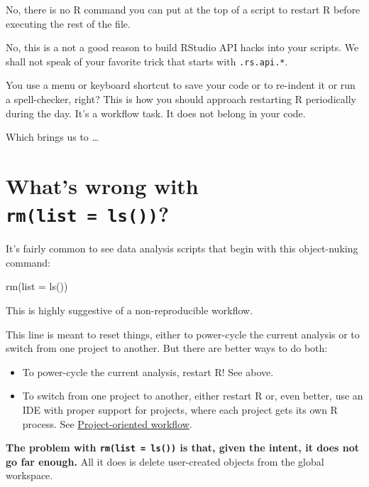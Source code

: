 \documentclass[
  letterpaper,
]{book}
\newenvironment{Shaded}{\begin{snugshade}}{\end{snugshade}}
\newcommand{\AttributeTok}[1]{\textcolor[rgb]{0.40,0.45,0.13}{#1}}
\newcommand{\FunctionTok}[1]{\textcolor[rgb]{0.28,0.35,0.67}{#1}}
\newcommand{\NormalTok}[1]{\textcolor[rgb]{0.00,0.23,0.31}{#1}}
\providecommand{\tightlist}{%
  \setlength{\itemsep}{0pt}\setlength{\parskip}{0pt}}\usepackage{longtable,booktabs,array}
\begin{document}
No, there is no R command you can put at the top of a script to restart
R before executing the rest of the file.

No, this is a not a good reason to build RStudio API hacks into your
scripts. We shall not speak of your favorite trick that starts with
\texttt{.rs.api.*}.

You use a menu or keyboard shortcut to save your code or to re-indent it
or run a spell-checker, right? This is how you should approach
restarting R periodically during the day. It's a workflow task. It does
not belong in your code.

Which brings us to \ldots{}

\hypertarget{rm-list-ls}{%
\section*{\texorpdfstring{What's wrong with
\texttt{rm(list\ =\ ls())}?}{What's wrong with rm(list = ls())?}}\label{rm-list-ls}}

It's fairly common to see data analysis scripts that begin with this
object-nuking command:

\begin{Shaded}
\begin{Highlighting}[]
\FunctionTok{rm}\NormalTok{(}\AttributeTok{list =} \FunctionTok{ls}\NormalTok{())}
\end{Highlighting}
\end{Shaded}

This is highly suggestive of a non-reproducible workflow.

This line is meant to reset things, either to power-cycle the current
analysis or to switch from one project to another. But there are better
ways to do both:

\begin{itemize}
\tightlist
\item
  To power-cycle the current analysis, restart R! See above.
\item
  To switch from one project to another, either restart R or, even
  better, use an IDE with proper support for projects, where each
  project gets its own R process. See
  \protect\hyperlink{project-oriented-workflow}{Project-oriented
  workflow}.
\end{itemize}

\textbf{The problem with \texttt{rm(list\ =\ ls())} is that, given the
intent, it does not go far enough.} All it does is delete user-created
objects from the global workspace.
\end{document}
